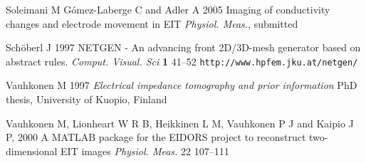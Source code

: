 \documentclass[12pt]{iopart}
\begin{document}
\begin{thebibliography}{99}
Soleimani M G\'omez-Laberge C and Adler A 2005
Imaging of conductivity changes and electrode movement in EIT
{\it Physiol. Meas.}, submitted

Sch\"oberl J 1997
NETGEN - An advancing front 2D/3D-mesh generator based on abstract rules.
{\it Comput. Visual. Sci} {\bf 1} 41--52
{\tt http://www.hpfem.jku.at/netgen/}

Vauhkonen M 
1997
{\it Electrical impedance tomography and prior information}
PhD thesis, University of Kuopio, Finland 

Vauhkonen M,
Lionheart W R B,
Heikkinen L M,
Vauhkonen P J and
Kaipio J P, 
2000
A MATLAB package for the EIDORS project to reconstruct
two-dimensional EIT images
{\it Physiol. Meas.} 22 107--111 
\end{thebibliography}
\end{document}
